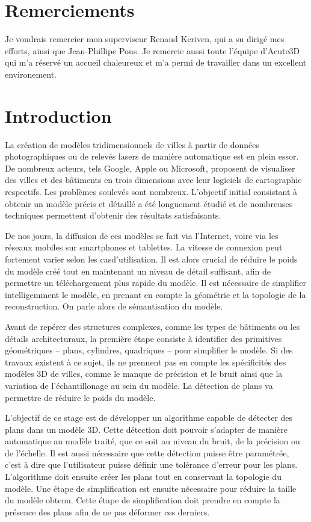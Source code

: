 ﻿\documentclass[12pt, twoside]{article}
\let\oldsection\section
\def\section{\cleardoublepage\oldsection}
\begin{document}
\section*{Remerciements}
Je voudrais remercier mon superviseur Renaud Keriven, qui a su dirigé mes efforts, ainsi que Jean-Phillipe Pons. Je remercie aussi toute l'équipe d'Acute3D qui m'a réservé un accueil chaleureux et m'a permi de travailler dans un excellent environement.
\newpage

\tableofcontents
\newpage

\section*{Introduction}
La création de modèles tridimensionnels de villes à partir de données photographiques ou de relevés lasers de manière automatique est en plein essor. De nombreux acteurs, tels Google, Apple ou Microsoft, proposent de visualiser des villes et des bâtiments en trois dimensions avec leur logiciels de cartographie respectifs. Les problèmes soulevés sont nombreux. L'objectif initial consistant à obtenir un modèle précis et détaillé a été longuement étudié et de nombreuses techniques permettent d'obtenir des résultats satisfaisants.

De nos jours, la diffusion de ces modèles se fait via l'Internet, voire via les réseaux mobiles sur smartphones et tablettes. La vitesse de connexion peut fortement varier selon les casd'utilisation. Il est alors crucial de réduire le poids du modèle créé tout en maintenant un niveau de détail suffisant, afin de permettre un téléchargement plus rapide du modèle. Il est nécessaire de simplifier intelligemment le modèle, en prenant en compte la géométrie et la topologie de la reconstruction. On parle alors de sémantisation du modèle.

Avant de repérer des structures complexes, comme les types de bâtiments ou les détails architecturaux, la première étape consiste à identifier des primitives géométriques -- plans, cylindres, quadriques -- pour simplifier le modèle. Si des travaux existent à ce sujet, ils ne prennent pas en compte les spécificités des modèles 3D de villes, comme le manque de précision et le bruit ainsi que la variation de l'échantillonage au sein du modèle. La détection de plans va permettre de réduire le poids du modèle.

L'objectif de ce stage est de développer un algorithme capable de détecter des plans dans un modèle 3D. Cette détection doit pouvoir s'adapter de manière automatique au modèle traité, que ce soit au niveau du bruit, de la précision ou de l'échelle. Il est aussi nécessaire que cette détection puisse être paramétrée, c'est à dire que l'utilisateur puisse définir une tolérance d'erreur pour les plans. L'algorithme doit ensuite créer les plans tout en conservant la topologie du modèle. Une étape de simplification est ensuite nécessaire pour réduire la taille du modèle obtenu. Cette étape de simplification doit prendre en compte la présence des plans afin de ne pas déformer ces derniers.
\newpage
\end{document}
